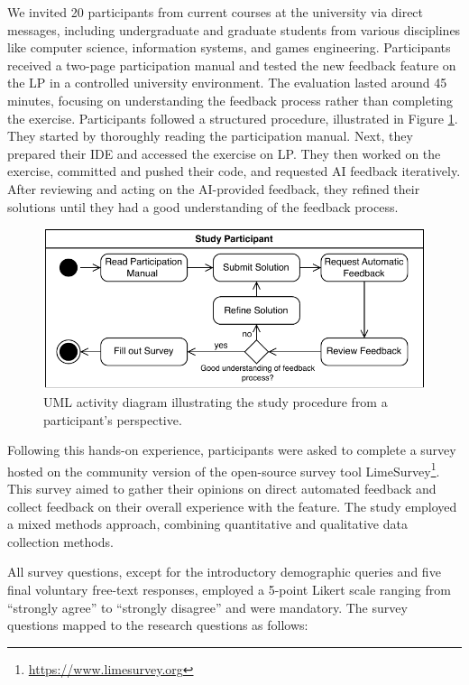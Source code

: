 \documentclass[sigconf,screen,review,anonymous]{acmart}
\begin{document}
We invited 20 participants from current courses at the university via direct messages, including undergraduate and graduate students from various disciplines like computer science, information systems, and games engineering. 
Participants received a two-page participation manual and tested the new feedback feature on the LP in a controlled university environment. 
The evaluation lasted around 45 minutes, focusing on understanding the feedback process rather than completing the exercise.
Participants followed a structured procedure, illustrated in Figure \ref{fig:Study-Design}.
They started by thoroughly reading the participation manual.
Next, they prepared their IDE and accessed the exercise on LP.
They then worked on the exercise, committed and pushed their code, and requested AI feedback iteratively.
After reviewing and acting on the AI-provided feedback, they refined their solutions until they had a good understanding of the feedback process.

\begin{figure}[htbp]
  \vspace{-3mm}
  \centering
  \includegraphics[width=\linewidth]{figures/Study-Design.pdf}
  \vspace{-5mm}
  \caption{UML activity diagram illustrating the study procedure from a participant's perspective.}
  \label{fig:Study-Design}
  \vspace{-3mm}
\end{figure}

Following this hands-on experience, participants were asked to complete a survey hosted on the community version of the open-source survey tool LimeSurvey\footnote{\url{https://www.limesurvey.org}}.
This survey aimed to gather their opinions on direct automated feedback and collect feedback on their overall experience with the feature.
The study employed a mixed methods approach, combining quantitative and qualitative data collection methods.

All survey questions, except for the introductory demographic queries and five final voluntary free-text responses, employed a 5-point Likert scale \cite{allen:2007:LikertScalesData} ranging from ``strongly agree'' to ``strongly disagree'' and were mandatory. 
The survey questions mapped to the research questions as follows:
\end{document}
